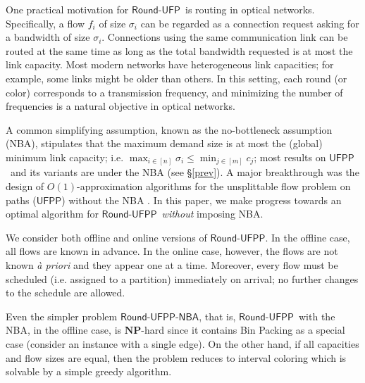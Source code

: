 \documentclass[a4paper,UKenglish]{lipics-v2016}
\newcommand{\ufpp}{\mbox{$\mathsf{UFPP}$}}
\newcommand{\rufp}{\mbox{$\mathsf{Round}$-$\mathsf{UFP}$}}
\newcommand{\rufpp}{\mbox{$\mathsf{Round}$-$\mathsf{UFPP}$}}
\newcommand{\rufppnba}{\mbox{$\mathsf{Round}$-$\mathsf{UFPP}$-$\mathsf{NBA}$}}
\theoremstyle{plain}
\newcommand{\rmax}{r_{\max}}
\begin{document}

One practical motivation for \rufp\ is routing in optical networks. Specifically, a flow $f_i$ of size $\sigma_i$ can be regarded as a connection request asking for a bandwidth of size $\sigma_i$. Connections using the same communication link can be routed at the same time as long as the total bandwidth requested is at most the link capacity. Most modern networks have heterogeneous link capacities; for example, some links might be older than others. In this setting, each round (or color) corresponds to a transmission frequency, and minimizing the number of frequencies is a natural objective in optical networks.

A common simplifying assumption, known as the no-bottleneck assumption (NBA), stipulates that the maximum demand size is at most the (global) minimum link capacity; i.e. $\max_{i\in [n]} \sigma_i \leq \min_{j\in [m]} c_j$; most results on \ufpp\ and its variants are under the NBA (see \S\ref{prev}). A major breakthrough was the design of $O(1)$-approximation algorithms for the unsplittable flow problem on paths (\ufpp) without the NBA \cite{bonsama,mazing}. In this paper, we make progress towards an optimal algorithm for \rufpp\ {\em without} imposing NBA. 

We consider both offline and online versions of \rufpp. In the offline case, all flows are known in advance. In the online case, however, the flows are not known {\em à priori} and they appear one at a time. Moreover, every flow must be scheduled (i.e. assigned to a partition) immediately on arrival; no further changes to the schedule are allowed.

Even the simpler problem \rufppnba, that is, \rufpp\ with the NBA, in the offline case, is $\mathbf{NP}$-hard since it contains Bin Packing as a special case (consider an instance with a single edge). On the other hand, if all capacities and flow sizes are equal, then the problem reduces to interval coloring which is solvable by a simple greedy algorithm.
\end{document}
